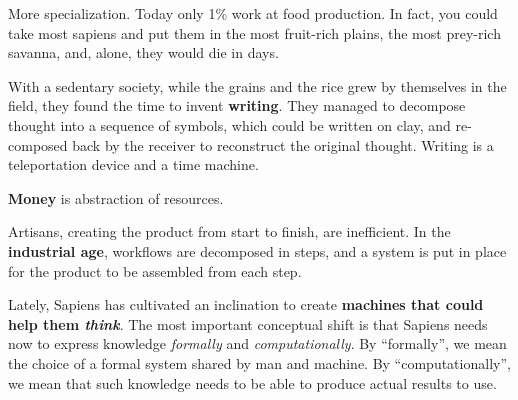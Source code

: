 More specialization.
Today only 1\% work at food production.
In fact, you could take most sapiens and put them in the most fruit-rich plains, the most prey-rich savanna, and, alone, they would die in days.


With a sedentary society, while the grains and the rice grew by themselves in the field, they found the time to invent \textbf{writing}.
They managed to decompose thought into a sequence of symbols, which could be written on clay, and re-composed back by the receiver to reconstruct the original thought.
Writing is a teleportation device and a time machine.

\textbf{Money} is abstraction of resources.

Artisans, creating the product from start to finish, are inefficient.
In the \textbf{industrial age}, workflows are decomposed in steps, and a system is put in place for the product to be assembled from each step.

Lately, Sapiens has cultivated an inclination to create \textbf{machines that could help them \emph{think}}.
The most important conceptual shift is that Sapiens needs now to express knowledge \emph{formally} and \emph{computationally}.
By ``formally'', we mean the choice of a formal system shared by man and machine.
By ``computationally'', we mean that such knowledge needs to be able to produce actual results to use.






%
%

